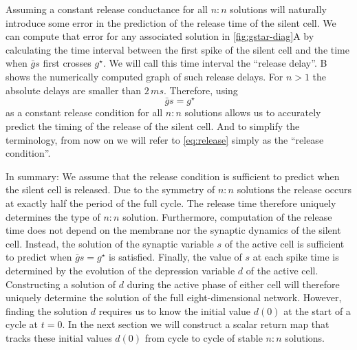 Assuming a constant release conductance for all $n:n$ solutions will naturally introduce some error in the prediction of the release time of the silent cell.
We can compute that error for any associated solution in \cref{fig:gstar-diag}A by calculating the time interval between the first spike of the silent cell and the time when $\bar g s$ first crosses $g^{\star}$.
We will call this time interval the ``release delay''.
B shows the numerically computed graph of such release delays.
For $n>1$ the absolute delays are smaller than $2\, \si{ms}$.
Therefore, using
\begin{equation}
	~\label{eq:release}
	\bar g s=g^{\star}
\end{equation}
as a constant release condition for all $n:n$ solutions allows us to accurately predict the timing of the release of the silent cell.
And to simplify the terminology, from now on we will refer to \cref{eq:release} simply as the ``release condition''.

In summary: We assume that the release condition is sufficient to predict when the silent cell is released.
Due to the symmetry of $n:n$ solutions the release occurs at exactly half the period of the full cycle.
The release time therefore uniquely determines the type of $n:n$ solution.
Furthermore, computation of the release time does not depend on the membrane nor the synaptic dynamics of the silent cell.
Instead, the solution of the synaptic variable $s$ of the active cell is sufficient to predict when $\bar g s =g^{\star}$ is satisfied.
Finally, the value of $s$ at each spike time is determined by the evolution of the depression variable $d$ of the active cell.
Constructing a solution of $d$ during the active phase of either cell will therefore uniquely determine the solution of the full eight-dimensional network.
However, finding the solution $d$ requires us to know the initial value $d(0)$ at the start of a cycle at $t=0$.
In the next section we will construct a scalar return map that tracks these initial values $d(0)$ from cycle to cycle of stable $n:n$ solutions.

